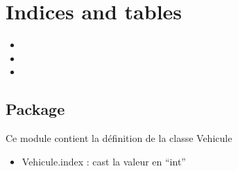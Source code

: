 \documentclass[a4paper,10pt,french]{sphinxmanual}
\begin{document}
\chapter{Indices and tables}
\label{\detokenize{index:indices-and-tables}}\begin{itemize}
\item {} 

\item {} 

\item {} 

\end{itemize}


\section{Package }
\label{\detokenize{index:package-road-objects}}\label{\detokenize{index:module-road_objects.vehicule}}
Ce module contient la définition de la classe Vehicule
\begin{itemize}
\item {} 
Vehicule.index : cast la valeur en “int”

\end{itemize}
\end{document}
